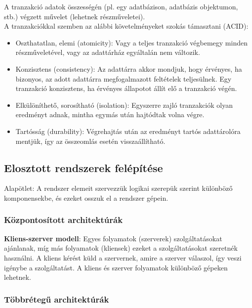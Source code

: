 \documentclass[12pt]{article}
\begin{document}
	\noindent A tranzakció adatok összességén (pl. egy adatbázison, adatbázis objektumon, stb.) végzett művelet (lehetnek részműveletei).\\

	\noindent A tranzakciókkal szemben az alábbi követelményeket szokás támasztani (ACID):
	
	\begin{itemize}
		\item	Oszthatatlan, elemi (atomicity): Vagy a teljes tranzakció végbemegy minden részműveletével, vagy az
		adattárház egyáltalán nem változik.
		
		\item	Konzisztens (consistency): Az adattárra akkor mondjuk, hogy érvényes, ha bizonyos, az adott adattárra
		megfogalmazott feltételek teljesülnek. Egy tranzakció konzisztens, ha érvényes állapotot állít elő a tranzakció
		végén.
		
		\item	Elkülöníthető, sorosítható (isolation): Egyszerre zajló tranzakciók olyan eredményt adnak, mintha
		egymás után hajtódtak volna végre.
		
		\item	Tartósság (durability): Végrehajtás után az eredményt tartós adattárolóra mentjük, így az összeomlás esetén
		visszaállítható.
	\end{itemize}
	
	
	\subsection{Elosztott rendszerek felépítése}
	Alapötlet: A rendszer elemeit szervezzük logikai szerepük szerint különböző komponensekbe, és ezeket osszuk
	el a rendszer gépein.\\
	
	\subsubsection{Központosított architektúrák}
	
	\noindent \textbf{Kliens-szerver modell}: Egyes folyamatok (szerverek) szolgáltatásokat ajánlanak, míg más folyamatok (kliensek)
	ezeket a szolgáltatásokat szeretnék használni. A kliens kérést küld a szervernek, amire a szerver válaszol, így veszi igénybe
	a szolgáltatást. A kliens és szerver folyamatok különböző gépeken lehetnek.
	
	\subsubsection{Többrétegű architektúrák}
	
\end{document}
